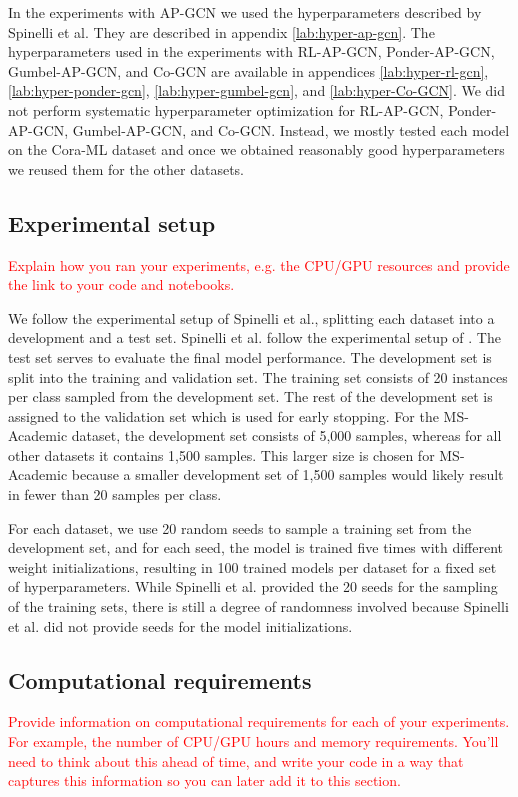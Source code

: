 \documentclass{gdl}
\begin{document}
In the experiments with AP-GCN we used the hyperparameters described by Spinelli et al. They are described in appendix \ref{lab:hyper-ap-gcn}. The hyperparameters used in the experiments with RL-AP-GCN, Ponder-AP-GCN, Gumbel-AP-GCN, and Co-GCN are available in appendices \ref{lab:hyper-rl-gcn}, \ref{lab:hyper-ponder-gcn}, \ref{lab:hyper-gumbel-gcn}, and \ref{lab:hyper-Co-GCN}. We did not perform systematic hyperparameter optimization for RL-AP-GCN, Ponder-AP-GCN, Gumbel-AP-GCN, and Co-GCN. Instead, we mostly tested each model on the Cora-ML dataset and once we obtained reasonably good hyperparameters we reused them for the other datasets. 

\subsection{Experimental setup}
\label{sec:experimental-setup}
\textcolor{red}{Explain how you ran your experiments, e.g. the CPU/GPU resources and provide the link to your code and notebooks.}

We follow the experimental setup of Spinelli et al., splitting each dataset into a development and a test set. Spinelli et al. follow the experimental setup of \cite{Klicpera2019}. The test set serves to evaluate the final model performance. The development set is split into the training and validation set. The training set consists of 20 instances per class sampled from the development set. The rest of the development set is assigned to the validation set which is used for early stopping. For the MS-Academic dataset, the development set consists of 5,000 samples, whereas for all other datasets it contains 1,500 samples. This larger size is chosen for MS-Academic because a smaller development set of 1,500 samples would likely result in fewer than 20 samples per class. 

For each dataset, we use 20 random seeds to sample a training set from the development set, and for each seed, the model is trained five times with different weight initializations, resulting in 100 trained models per dataset for a fixed set of hyperparameters. While Spinelli et al. provided the 20 seeds for the sampling of the training sets, there is still a degree of randomness involved because Spinelli et al. did not provide seeds for the model initializations.

\subsection{Computational requirements}
\textcolor{red}{Provide information on computational requirements for each of your experiments. For example, the number of CPU/GPU hours and memory requirements. You'll need to think about this ahead of time, and write your code in a way that captures this information so you can later add it to this section. }
\end{document}
